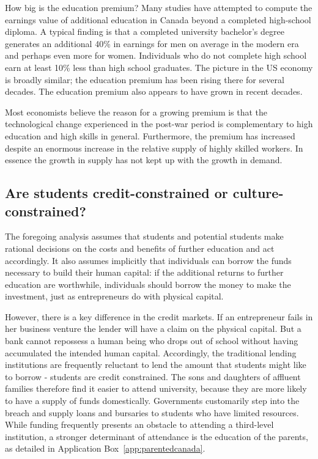 \begin{ApplicationBox}{How big is the education premium? \label{app:educationpremium}}
Many studies have attempted to compute the earnings value of additional education in Canada beyond a completed high-school diploma. A typical finding is that a completed university bachelor’s degree generates an additional 40\% in earnings for men on average in the modern era and perhaps even more for women. Individuals who do not complete high school earn at least 10\% less than high school graduates. The picture in the US economy is broadly similar; the education premium has been rising there for several decades. The education premium also appears to have grown in recent decades.

\bigskip
Most economists believe the reason for a growing premium is that the technological change experienced in the post-war period is complementary to high education and high skills in general. Furthermore, the premium has increased despite an enormous increase in the relative supply of highly skilled workers. In essence the growth in supply has not kept up with the growth in demand. 
\end{ApplicationBox}

\subsection*{Are students credit-constrained or culture-constrained?}

The foregoing analysis assumes that students and potential students make rational decisions on the costs and benefits of further education and act accordingly. It also assumes implicitly that individuals can borrow the funds necessary to build their human capital: if the additional returns to further education are worthwhile, individuals should borrow the money to make the investment, just as entrepreneurs do with physical capital.

However, there is a key difference in the credit markets. If an entrepreneur fails in her business venture the lender will have a claim on the physical capital. But a bank cannot repossess a human being who drops out of school without having accumulated the intended human capital. Accordingly, the traditional lending institutions are frequently reluctant to lend the amount that students might like to borrow - students are credit constrained. The sons and daughters of affluent families therefore find it easier to attend university, because they are more likely to have a supply of funds domestically. Governments customarily step into the breach and supply loans and bursaries to students who have limited resources. While funding frequently presents an obstacle to attending a third-level institution, a stronger determinant of attendance is the education of the parents, as detailed in Application Box~\ref{app:parentedcanada}.

